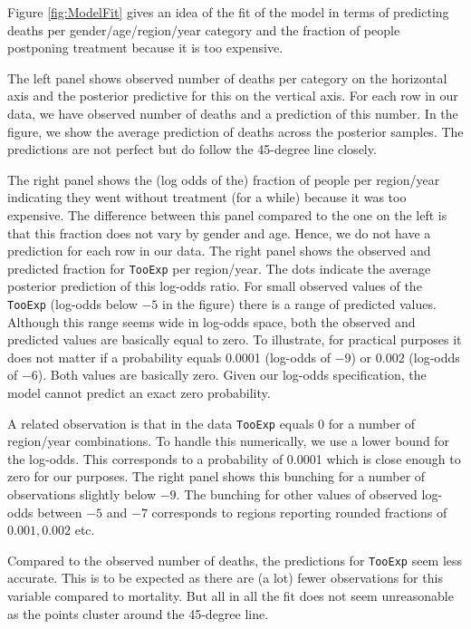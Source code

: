 \documentclass[a4paper,12pt]{article}
\begin{document}
Figure \ref{fig:ModelFit} gives an idea of the fit of the model in terms of predicting deaths per gender/age/region/year category and the fraction of people postponing treatment because it is too expensive.

The left panel shows observed number of deaths per category on the horizontal axis and the posterior predictive for this on the vertical axis. For each row in our data, we have observed number of deaths and a prediction of this number. In the figure, we show the average prediction of deaths across the posterior samples. The predictions are not perfect but do follow the 45-degree line closely.

The right panel shows the (log odds of the) fraction of people per region/year indicating they went without treatment (for a while) because it was too expensive. The difference between this panel compared to the one on the left is that this fraction does not vary by gender and age. Hence, we do not have a prediction for each row in our data. The right panel shows the observed and predicted fraction for \texttt{TooExp} per region/year. The dots indicate the average posterior prediction of this log-odds ratio. For small observed values of the \texttt{TooExp} (log-odds below \(-5\) in the figure) there is a range of predicted values. Although this range seems wide in log-odds space, both the observed and predicted values are basically equal to zero. To illustrate, for practical purposes it does not matter if a probability equals 0.0001 (log-odds of \(-9\)) or 0.002 (log-odds of \(-6\)). Both values are basically zero. Given our log-odds specification, the model cannot predict an exact zero probability.

A related observation is that in the data \texttt{TooExp} equals 0 for a number of region/year combinations. To handle this numerically, we use a lower bound for the log-odds. This corresponds to a probability of 0.0001 which is close enough to zero for our purposes. The right panel shows this bunching for a number of observations slightly below \(-9\). The bunching for other values of observed log-odds between \(-5\) and \(-7\) corresponds to regions reporting rounded fractions of \(0.001,0.002\) etc.

Compared to the observed number of deaths, the predictions for \texttt{TooExp} seem less accurate. This is to be expected as there are (a lot) fewer observations for this variable compared to mortality. But all in all the fit does not seem unreasonable as the points cluster around the 45-degree line.
\end{document}
